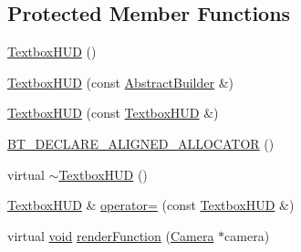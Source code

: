 \subsection*{Protected Member Functions}
\begin{DoxyCompactItemize}
\item 
\mbox{\hyperlink{classnjli_1_1_textbox_h_u_d_a9a0ce975431d7930d46a0406bf82bffb}{Textbox\+H\+UD}} ()
\item 
\mbox{\hyperlink{classnjli_1_1_textbox_h_u_d_a72ea32640b49facfc173d4bce0154059}{Textbox\+H\+UD}} (const \mbox{\hyperlink{classnjli_1_1_abstract_builder}{Abstract\+Builder}} \&)
\item 
\mbox{\hyperlink{classnjli_1_1_textbox_h_u_d_a2c12dbf9d897e48706af201df9e01cb2}{Textbox\+H\+UD}} (const \mbox{\hyperlink{classnjli_1_1_textbox_h_u_d}{Textbox\+H\+UD}} \&)
\item 
\mbox{\hyperlink{classnjli_1_1_textbox_h_u_d_a75cfd14dba59041431b7363277633168}{B\+T\+\_\+\+D\+E\+C\+L\+A\+R\+E\+\_\+\+A\+L\+I\+G\+N\+E\+D\+\_\+\+A\+L\+L\+O\+C\+A\+T\+OR}} ()
\item 
virtual \mbox{\hyperlink{classnjli_1_1_textbox_h_u_d_a916afbb16ab51854f231640c145b8a12}{$\sim$\+Textbox\+H\+UD}} ()
\item 
\mbox{\hyperlink{classnjli_1_1_textbox_h_u_d}{Textbox\+H\+UD}} \& \mbox{\hyperlink{classnjli_1_1_textbox_h_u_d_a9d253eccffd7f570e70c436ebb823e14}{operator=}} (const \mbox{\hyperlink{classnjli_1_1_textbox_h_u_d}{Textbox\+H\+UD}} \&)
\item 
virtual \mbox{\hyperlink{_thread_8h_af1e856da2e658414cb2456cb6f7ebc66}{void}} \mbox{\hyperlink{classnjli_1_1_textbox_h_u_d_a6daa89a33de35e6cf85b56970447a3a8}{render\+Function}} (\mbox{\hyperlink{classnjli_1_1_camera}{Camera}} $\ast$camera)
\end{DoxyCompactItemize}
